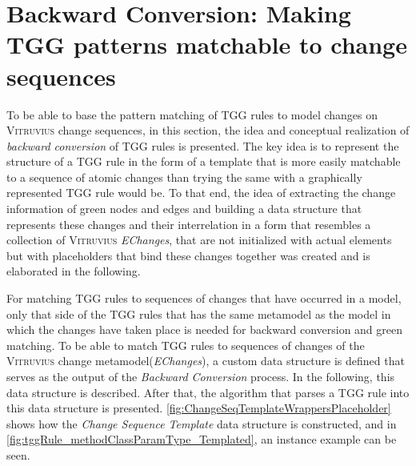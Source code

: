 \section{Backward Conversion: Making TGG patterns matchable to change sequences}
\label{sec:Concept:BackwardConversionPM:BackwardConversion}
To be able to base the pattern matching of TGG rules to model changes on \textsc{Vitruvius} change sequences, in this section, the idea and conceptual realization of \emph{backward conversion} of TGG rules is presented. The key idea is to represent the structure of a TGG rule in the form of a template that is more easily matchable to a sequence of atomic changes than trying the same with a graphically represented TGG rule would be. To that end, the idea of extracting the change information of green nodes and edges and building a data structure that represents these changes and their interrelation in a form that resembles a collection of \textsc{Vitruvius} \emph{EChanges}, that are not initialized with actual elements but with placeholders that bind these changes together was created and is elaborated in the following.

For matching TGG rules to sequences of changes that have occurred in a model, only that side of the TGG rules that has the same metamodel as the model in which the changes have taken place is needed for backward conversion and green matching.
To be able to match TGG rules to sequences of changes of the \textsc{Vitruvius} change metamodel(\emph{EChanges}), a custom data structure is defined that serves as the output of the \emph{Backward Conversion} process.
In the following, this data structure is described. After that, the algorithm that parses a TGG rule into this data structure is presented.
\autoref{fig:ChangeSeqTemplateWrappersPlaceholder} shows how the \emph{Change Sequence Template} data structure is constructed, and in \autoref{fig:tggRule_methodClassParamType_Templated}, an instance example can be seen.


